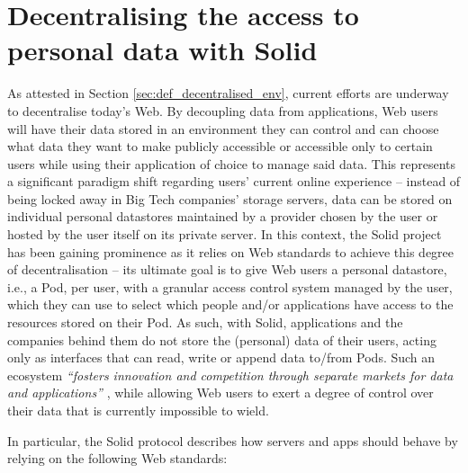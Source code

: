 \section{Decentralising the access to personal data with Solid}
\label{sec:sota_solid}

As attested in Section \ref{sec:def_decentralised_env}, current efforts are underway to decentralise today's Web. By decoupling data from applications, Web users will have their data stored in an environment they can control and can choose what data they want to make publicly accessible or accessible only to certain users while using their application of choice to manage said data.
This represents a significant paradigm shift regarding users' current online experience -- instead of being locked away in Big Tech companies' storage servers, data can be stored on individual personal datastores maintained by a provider chosen by the user or hosted by the user itself on its private server.
In this context, the Solid project \citep{sambra_solid_2016,mansour_demonstration_2016} has been gaining prominence as it relies on Web standards to achieve this degree of decentralisation -- its ultimate goal is to give Web users a personal datastore, i.e., a Pod, per user, with a granular access control system managed by the user, which they can use to select which people and/or applications have access to the resources stored on their Pod.
As such, with Solid, applications and the companies behind them do not store the (personal) data of their users, acting only as interfaces that can read, write or append data to/from Pods.
Such an ecosystem \textit{``fosters innovation and competition through separate markets for data and applications''} \citep{verborgh_paradigm_2017}, while allowing Web users to exert a degree of control over their data that is currently impossible to wield.

In particular, the Solid protocol \citep{capadisli_solid_2022} describes how servers and apps should behave by relying on the following Web standards:

